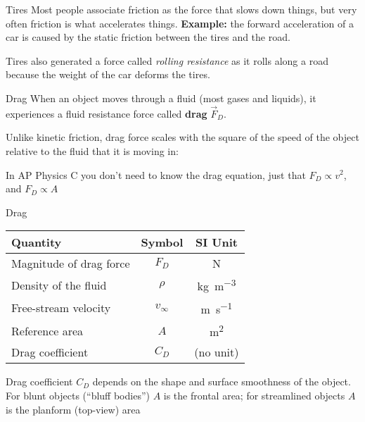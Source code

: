 \documentclass[12pt,compress,aspectratio=169]{beamer}
\begin{document}
\begin{frame}{Tires}
  Most people associate friction as the force that slows down things, but very
  often friction is what accelerates things. \textbf{Example:} the forward
  acceleration of a car is caused by the static friction between the tires and
  the road.
  \begin{center}
  \end{center}
  Tires also generated a force called \emph{rolling resistance} as it rolls
  along a road because the weight of the car deforms the tires.
\end{frame}




\begin{frame}{Drag}
  When an object moves through a fluid (most gases and liquids), it experiences
  a fluid resistance force called \textbf{drag} $\vec F_D$.
  \begin{center}
  \end{center}
  Unlike kinetic friction, drag force scales with the square of the speed of the
  object relative to the fluid that it is moving in:
  

  \vspace{-.1in}In AP Physics C you don't need to know the drag equation,
  just that $F_D\propto v^2$, and $F_D\propto A$
\end{frame}



\begin{frame}{Drag}
  \begin{center}
    \begin{tabular}{l|c|c}
      \rowcolor{pink}
      \textbf{Quantity} & \textbf{Symbol} & \textbf{SI Unit} \\ \hline
      Magnitude of drag force & $F_D$     & \si\newton \\
      Density of the fluid    & $\rho$    & \si{\kilo\gram\per\metre\cubed}\\
      Free-stream velocity    & $v_\infty$ & \si{\metre\per\second}\\
      Reference area          & $A$       & \si{\metre\squared}\\
      Drag coefficient        & $C_D$     & (no unit)
    \end{tabular}
  \end{center}
  Drag coefficient $C_D$ depends on the shape and surface smoothness of the
  object. For blunt objects (``bluff bodies'') $A$ is the frontal area; for
  streamlined objects $A$ is the planform (top-view) area
\end{frame}
\end{document}
